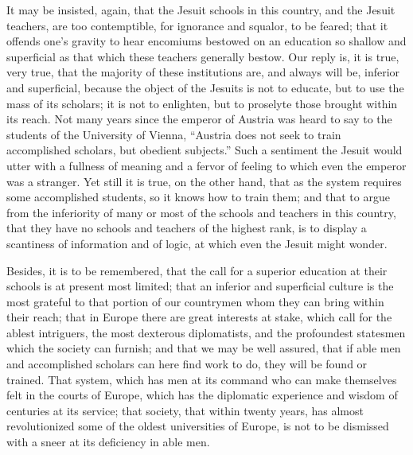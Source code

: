 \documentclass[]{book}
\begin{document}
It may be insisted, again, that the Jesuit schools in this country, and the Jesuit teachers, are too contemptible, for ignorance and squalor, to be feared; that it offends one's gravity to hear encomiums bestowed on an education so shallow and superficial as that which these teachers generally bestow. Our reply is, it is true, very true, that the majority of these institutions are, and always will be, inferior and superficial, because the object of the Jesuits is not to educate, but to use the mass of its scholars; it is not to enlighten, but to proselyte those brought within its reach. Not many years since the emperor of Austria was heard to say to the students of the University of Vienna, ``Austria does not seek to train accomplished scholars, but obedient subjects.'' Such a sentiment the Jesuit would utter with a fullness of meaning and a fervor of feeling to which even the emperor was a stranger. Yet still it is true, on the other hand, that as the system requires some accomplished students, so it knows how to train them; and that to argue from the inferiority of many or most of the schools and teachers in this country, that they have no schools and teachers of the highest rank, is to display a scantiness of information and of logic, at which even the Jesuit might wonder.

Besides, it is to be remembered, that the call for a superior education at their schools is at present most limited; that an inferior and superficial culture is the most grateful to that portion of our countrymen whom they can bring within their reach; that in Europe there are great interests at stake, which call for the ablest intriguers, the most dexterous diplomatists, and the profoundest statesmen which the society can furnish; and that we may be well assured, that if able men and accomplished scholars can here find work to do, they will be found or trained. That system, which has men at its command who can make themselves felt in the courts of Europe, which has the diplomatic experience and wisdom of centuries at its service; that society, that within twenty years, has almost revolutionized some of the oldest universities of Europe, is not to be dismissed with a sneer at its deficiency in able men.
\end{document}
